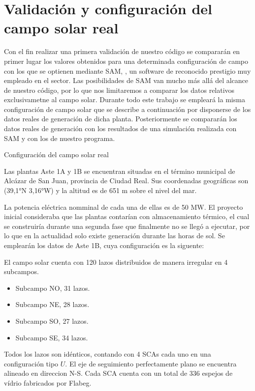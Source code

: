 \section{Validación y configuración del campo solar real}

Con el fin realizar una primera validación de nuestro código se compararán en primer lugar los valores obtenidos para una determinada configuración de campo con los que se optienen mediante SAM, \cite{1022085/NBJ6NM3F}, un software de reconocido prestigio muy empleado en el sector. Las posibilidades de SAM van mucho más allá del alcance de nuestro código, por lo que nos limitaremos a comparar los datos relativos exclusivametne al campo solar. Durante todo este trabajo
se empleará la misma configuración de campo solar que se describe a continuación por disponerse de los datos reales de generación de dicha planta. Posteriormente se compararán los datos reales de generación con los resultados de una simulación realizada con SAM y con los de nuestro programa.

\hypertarget{configuraciuxf3n-del-campo-solar-real}{Configuración del campo solar real}

Las plantas Aste 1A y 1B se encuentran situadas en el término municipal de Alcázar de San Juan, provincia de Ciudad Real. Sus coordenadas geográficas son (39,1°N 3,16°W) y la altitud es de 651 m sobre el nivel del mar.

La potencia eléctrica nomminal de cada una de ellas es de 50 MW. El proyecto inicial consideraba que las plantas contarían con almacenamiento térmico, el cual se construiría durante una segunda fase que finalmente no se llegó a ejecutar, por lo que en la actualidad solo existe generación durante las horas de sol. Se emplearán los datos de Aste 1B, cuya configuración es la siguente:

El campo solar cuenta con 120 lazos distribuidos de manera irregular en 4 subcampos.

\begin{itemize}
\item
  Subcampo NO, 31 lazos.
\item
  Subcampo NE, 28 lazos.
\item
  Subcampo SO, 27 lazos.
\item
  Subcampo SE, 34 lazos.
\end{itemize}

Todos los lazos son idénticos, contando con 4 SCAs cada uno en una configuración tipo \(U\). El eje de seguimiento perfectamente plano se encuentra alineado en direccion N-S. Cada SCA cuenta con un total de 336 espejos de vídrio fabricados por Flabeg.


